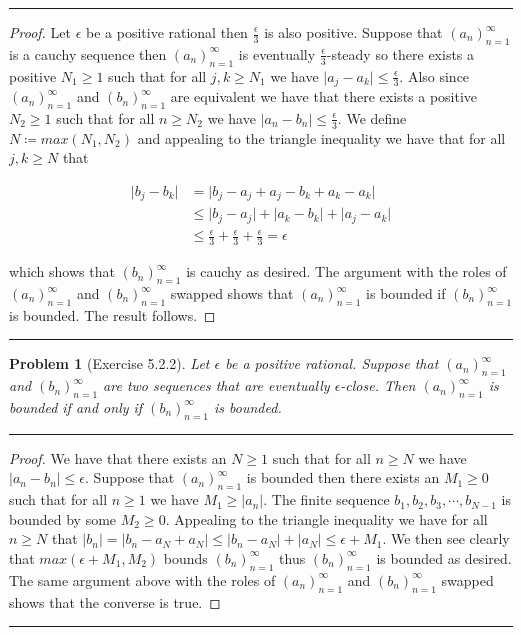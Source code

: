 \documentclass{article}
\newcommand{\lined}{\noindent\rule{\textwidth}{1pt}}
\newtheorem*{problem}{Problem}
\begin{document}
	\lined
		\begin{proof}
			Let $\epsilon$ be a positive rational then $\frac{\epsilon}{3}$ is also positive. Suppose that $(a_n)_{n = 1}^{\infty}$ is a cauchy sequence then $(a_n)_{n = 1}^{\infty}$ is eventually $\frac{\epsilon}{3}$-steady so there exists a positive $N_1 \geq 1$ such that for all $j,k \geq N_1$ we have $\lvert a_j - a_k \rvert \leq \frac{\epsilon}{3}$. Also since $(a_n)_{n = 1}^{\infty}$ and  $(b_n)_{n = 1}^{\infty}$ are equivalent we have that there exists a positive $N_2 \geq 1$ such that for all $n \geq N_2$ we have $\lvert a_n - b_n \rvert \leq \frac{\epsilon}{3}$. 
We define $N \coloneqq max(N_1, N_2)$ and appealing to the triangle inequality we have that for all $j,k \geq N$ that 

	\begin{align*}
		\lvert b_j - b_k \rvert  & = \lvert b_j - a_j + a_j  - b_k + a_k - a_k \rvert \\ & \leq \lvert b_j - a_j \rvert  + \lvert a_k - b_k \rvert + \lvert a_j - a_k \rvert 
		 \\ & \leq \frac{\epsilon}{3} + \frac{\epsilon}{3} + \frac{\epsilon}{3} = \epsilon
	\end{align*}
	
	\noindent which shows that $(b_n)_{n = 1}^{\infty}$ is cauchy as desired. The argument with the roles of $(a_n)_{n = 1}^{\infty}$ and  $(b_n)_{n = 1}^{\infty}$ swapped shows that $(a_n)_{n = 1}^{\infty}$ is bounded if $(b_n)_{n = 1}^{\infty}$ is bounded. The result follows.
		\end{proof}
	\lined
	
	\newpage
	
	\begin{problem}[Exercise 5.2.2]
		Let $\epsilon$ be a positive rational. Suppose that $(a_n)_{n = 1}^{\infty}$ and  $(b_n)_{n = 1}^{\infty}$ are two sequences that are eventually $\epsilon$-close. Then $(a_n)_{n = 1}^{\infty}$ is bounded if and  only if $(b_n)_{n = 1}^{\infty}$ is bounded.
	\end{problem}
	
	\lined
		\begin{proof}
			We have that there exists an $N \geq 1$ such that for all $n \geq N$ we have $\lvert a_n - b_n \rvert \leq \epsilon$. Suppose that $(a_n)_{n = 1}^{\infty}$ is bounded then there exists an $M_1 \geq 0$ such that for all $n \geq 1$ we have $M_1 \geq \lvert a_n \rvert$. The finite sequence $b_1,b_2,b_3,\cdots,b_{N-1}$ is bounded by some $M_2 \geq 0$. Appealing to the triangle inequality we have for all $n \geq N$ that $\lvert b_n \rvert = \lvert b_n - a_N + a_N \rvert \leq 
			 \lvert b_n - a_N \rvert + \lvert a_N \rvert \leq \epsilon + M_1$. 
	We then see clearly that $max(\epsilon + M_1, M_2)$ bounds $(b_n)_{n = 1}^{\infty}$ thus $(b_n)_{n = 1}^{\infty}$ is bounded as desired. The same argument above with the roles of $(a_n)_{n = 1}^{\infty}$ and $(b_n)_{n = 1}^{\infty}$ swapped shows that the converse is true. 
		\end{proof}
	\lined

	
\end{document}
